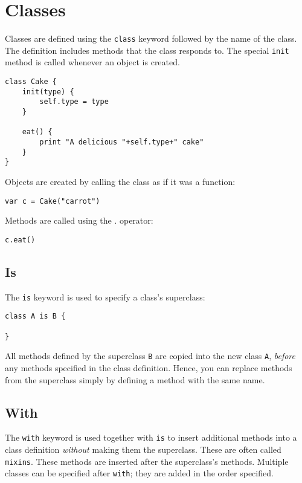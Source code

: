 \hypertarget{classes}{%
\section{Classes}\label{classes}}

Classes are defined using the \texttt{class} keyword followed by the
name of the class. The definition includes methods that the class
responds to. The special \texttt{init} method is called whenever an
object is created.

\begin{lstlisting}
class Cake {
    init(type) {
        self.type = type
    }

    eat() {
        print "A delicious "+self.type+" cake"
    }
}
\end{lstlisting}

Objects are created by calling the class as if it was a function:

\begin{lstlisting}
var c = Cake("carrot")
\end{lstlisting}

Methods are called using the . operator:

\begin{lstlisting}
c.eat()
\end{lstlisting}

\hypertarget{is}{%
\subsection{Is}\label{is}}

The \texttt{is} keyword is used to specify a class's superclass:

\begin{lstlisting}
class A is B {

}
\end{lstlisting}

All methods defined by the superclass \texttt{B} are copied into the new
class \texttt{A}, \emph{before} any methods specified in the class
definition. Hence, you can replace methods from the superclass simply by
defining a method with the same name.

\hypertarget{with}{%
\subsection{With}\label{with}}

The \texttt{with} keyword is used together with \texttt{is} to insert
additional methods into a class definition \emph{without} making them
the superclass. These are often called \texttt{mixins}. These methods
are inserted after the superclass's methods. Multiple classes can be
specified after \texttt{with}; they are added in the order specified.

